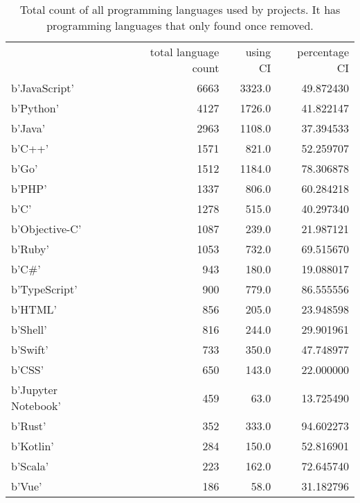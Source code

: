 \begin{table}
\centering
\caption{Total count of all programming languages used by projects. It has programming languages that only found once removed.}
\label{table:languages}
\begin{tabular}{|l|r|r|r|}
\hline
{} &  total language count &  using CI &  percentage CI \\

b'JavaScript'       &                  6663 &    3323.0 &      49.872430 \\
b'Python'           &                  4127 &    1726.0 &      41.822147 \\
b'Java'             &                  2963 &    1108.0 &      37.394533 \\
b'C++'              &                  1571 &     821.0 &      52.259707 \\
b'Go'               &                  1512 &    1184.0 &      78.306878 \\
b'PHP'              &                  1337 &     806.0 &      60.284218 \\
b'C'                &                  1278 &     515.0 &      40.297340 \\
b'Objective-C'      &                  1087 &     239.0 &      21.987121 \\
b'Ruby'             &                  1053 &     732.0 &      69.515670 \\
b'C\#'               &                   943 &     180.0 &      19.088017 \\
b'TypeScript'       &                   900 &     779.0 &      86.555556 \\
b'HTML'             &                   856 &     205.0 &      23.948598 \\
b'Shell'            &                   816 &     244.0 &      29.901961 \\
b'Swift'            &                   733 &     350.0 &      47.748977 \\
b'CSS'              &                   650 &     143.0 &      22.000000 \\
b'Jupyter Notebook' &                   459 &      63.0 &      13.725490 \\
b'Rust'             &                   352 &     333.0 &      94.602273 \\
b'Kotlin'           &                   284 &     150.0 &      52.816901 \\
b'Scala'            &                   223 &     162.0 &      72.645740 \\
b'Vue'              &                   186 &      58.0 &      31.182796 \\

\end{tabular}
\end{table}
